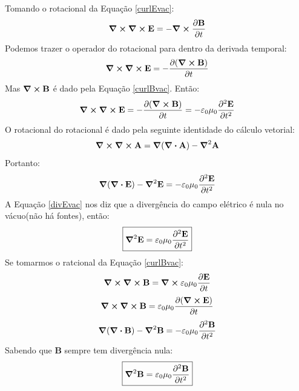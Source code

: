 \documentclass[12pt,a4paper]{report}
\begin{document}
Tomando o rotacional da Equação \ref{curlEvac}:
\begin{equation}
    \curl{\curl{\textbf{E}}}=-\curl{\frac{\partial\textbf{B}}{\partial t}}
\end{equation}
Podemos trazer o operador do rotacional para dentro da derivada temporal:
\begin{equation}
    \curl{\curl{\textbf{E}}}=-\frac{\partial(\curl{\textbf{B})}}{\partial t}
\end{equation}
Mas $\curl{\textbf{B}}$ é dado pela Equação \ref{curlBvac}. Então:
\begin{equation}
    \curl{\curl{\textbf{E}}}=-\frac{\partial(\curl{\textbf{B})}}{\partial t}=-\varepsilon_0\mu_0\frac{\partial^2\textbf{E}}{\partial t^2}
\end{equation}
O rotacional do rotacional é dado pela seguinte identidade do cálculo vetorial:
\begin{equation}
    \curl{\curl{\textbf{A}}}=\grad{(\div{\textbf{A}})}-\grad^2{\textbf{A}}
\end{equation}
Portanto:
\begin{equation}
   \grad{(\div{\textbf{E}})}-\grad^2{\textbf{E}}=-\varepsilon_0\mu_0\frac{\partial^2\textbf{E}}{\partial t^2}
\end{equation}
A Equação \ref{divEvac} nos diz que a divergência do campo elétrico é nula no vácuo(não há fontes), então:
\begin{equation}
   \boxed{\grad^2{\textbf{E}}=\varepsilon_0\mu_0\frac{\partial^2\textbf{E}}{\partial t^2}}
\end{equation}
Se tomarmos o ratcional da Equação \ref{curlBvac}:
\begin{equation}
    \curl{\curl{\textbf{B}}}=\curl{\varepsilon_0\mu_0\frac{\partial\textbf{E}}{\partial t}}
\end{equation}
\begin{equation}
    \curl{\curl{\textbf{B}}}=\varepsilon_0\mu_0\frac{\partial(\curl{\textbf{E}})}{\partial t}
\end{equation}
\begin{equation}
    \grad{(\div{\textbf{B}})}-\grad^2{\textbf{B}}=-\varepsilon_0\mu_0\frac{\partial^2\textbf{B}}{\partial t^2}
\end{equation}
Sabendo que $\textbf{B}$ sempre tem divergência nula:
\begin{equation}
    \boxed{\grad^2{\textbf{B}}=\varepsilon_0\mu_0\frac{\partial^2\textbf{B}}{\partial t^2}}
\end{equation}
\end{document}
